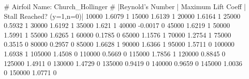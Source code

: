 # Airfoil Name: Church_Hollinger
# |Reynold's Number | Maximum Lift Coeff | Stall Reached? (y=1,n=0)|
10000 1.6079 1
15000 1.6139 1
20000 1.6164 1
25000 0.5932 1
30000 1.6192 1
35000 1.621 1
40000 -0.0017 0
45000 1.6219 1
50000 1.5991 1
55000 1.6265 1
60000 0.1785 0
65000 1.1576 1
70000 1.2754 1
75000 0.3515 0
80000 0.2957 0
85000 1.6628 1
90000 1.6366 1
95000 1.5711 0
100000 1.6938 1
105000 1.4508 0
110000 0.5669 0
115000 1.7856 1
120000 0.8845 0
125000 1.4911 0
130000 1.4729 0
135000 0.9419 0
140000 0.9659 0
145000 1.0036 0
150000 1.0771 0
